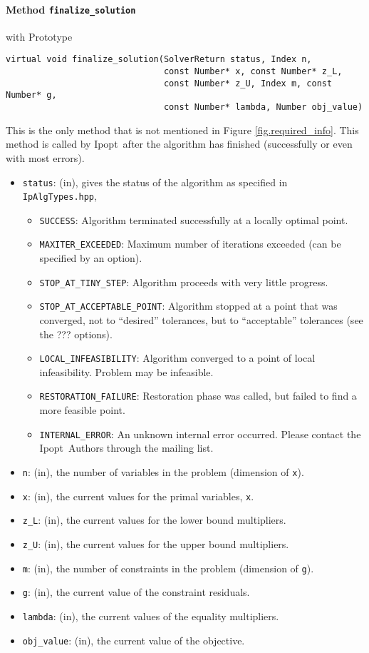 \documentclass[letter,10pt]{article}
\newcommand{\Ipopt}{{\sc Ipopt}}
\begin{document}
\paragraph{Method \texttt{finalize\_solution}} with Prototype
\begin{verbatim}
virtual void finalize_solution(SolverReturn status, Index n,
                               const Number* x, const Number* z_L,
                               const Number* z_U, Index m, const Number* g,
                               const Number* lambda, Number obj_value)
\end{verbatim}
This is the only method that is not mentioned in Figure
\ref{fig.required_info}. This method is called by \Ipopt\ after the
algorithm has finished (successfully or even with most errors).
\begin{itemize}
\item {\tt status}: (in), gives the status of the algorithm 
        as specified in {\tt IpAlgTypes.hpp},
        \begin{itemize}
        \item {\tt SUCCESS}: Algorithm terminated successfully 
        at a locally optimal point.
        \item {\tt MAXITER\_EXCEEDED}: Maximum number of iterations 
        exceeded (can be specified by an option).
        \item {\tt STOP\_AT\_TINY\_STEP}: Algorithm proceeds with very little
        progress. 
        \item {\tt STOP\_AT\_ACCEPTABLE\_POINT}: Algorithm stopped at a point
        that was converged, not to ``desired'' tolerances, 
        but to ``acceptable'' tolerances (see the ??? options).
        \item {\tt LOCAL\_INFEASIBILITY}: Algorithm converged to a point 
        of local infeasibility. Problem may be infeasible.
        \item {\tt RESTORATION\_FAILURE}: Restoration phase was called, but 
        failed to find a more feasible point.
        \item {\tt INTERNAL\_ERROR}: An unknown internal error occurred. Please
        contact the \Ipopt\ Authors through the mailing list.
        \end{itemize}
\item {\tt n}: (in), the number of variables in the problem (dimension of {\tt x}). 
\item {\tt x}: (in), the current values for the primal variables, {\tt x}.
\item {\tt z\_L}: (in), the current values for the lower bound multipliers.
\item {\tt z\_U}: (in), the current values for the upper bound multipliers.
\item {\tt m}: (in), the number of constraints in the problem (dimension of {\tt g}).
\item {\tt g}: (in), the current value of the constraint residuals.
\item {\tt lambda}: (in), the current values of the equality multipliers.
\item {\tt obj\_value}: (in), the current value of the objective.
\end{itemize}
\end{document}
